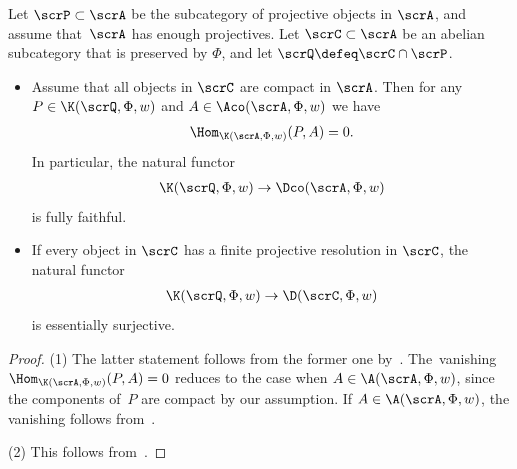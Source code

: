 \begin{prop}\label{proj resol}
Let $\scrP\subset \scrA$ be the subcategory of projective objects in $\scrA$, and assume that~$\scrA$ has enough projectives. Let $\scrC\subset \scrA$ be an abelian subcategory that is preserved by $\Phi$, and let $\scrQ\defeq\scrC\cap \scrP$.
\begin{itemize}\itemsep=0pt
\item[$1.$] Assume that all objects in $\scrC$ are compact in $\scrA$. Then for any $P\in \K(\scrQ,\Phi,w)$ and $A\in \Aco(\scrA,\Phi,w)$ we have
\begin{gather*}
\Hom_{\K(\scrA,\Phi,w)}(P,A)=0.
\end{gather*}
In particular,
the natural functor
\begin{gather*}
\K(\scrQ,\Phi,w)\to\Dco(\scrA,\Phi,w)
\end{gather*}
is fully faithful.

\item[$2.$] If every object in $\scrC$ has a finite projective resolution in $\scrC$, the natural functor
\begin{gather*}
\K(\scrQ,\Phi,w)\to\D(\scrC,\Phi,w)
\end{gather*}
is essentially surjective.
\end{itemize}
\begin{proof}
(1) The latter statement follows from the former one by~\cite[Proposition~B.2]{ls}. The~vani\-shing $\Hom_{\K(\scrA,\Phi,w)}(P,A)=0$ reduces to the case when $A\in \A(\scrA,\Phi,w)$, since the components of~$P$ are compact by our assumption. If $A\in \A(\scrA,\Phi,w)$, the vanishing follows from~\cite[Lemma~2.4]{bdfik}.

(2) This follows from~\cite[Proposition~2.22]{bdfik}.
\end{proof}
\end{prop}


